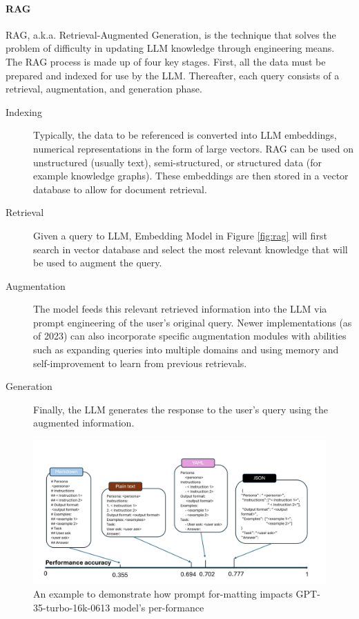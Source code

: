 \documentclass[fleqn,10pt]{SelfArx} %
\begin{document}
\paragraph{RAG} RAG, a.k.a. Retrieval-Augmented Generation, is the technique that solves the problem of difficulty in updating LLM knowledge through engineering means. The RAG process is made up of four key stages. First, all the data must be prepared and indexed for use by the LLM. Thereafter, each query consists of a retrieval, augmentation, and generation phase.\cite{gao2024retrievalaugmentedgenerationlargelanguage}
\begin{description}
	\item[Indexing] Typically, the data to be referenced is converted into LLM embeddings, numerical representations in the form of large vectors. RAG can be used on unstructured (usually text), semi-structured, or structured data (for example knowledge graphs).\cite{gao2024retrievalaugmentedgenerationlargelanguage} These embeddings are then stored in a vector database to allow for document retrieval.
	\item[Retrieval] Given a query to LLM, Embedding Model in Figure \ref{fig:rag} will first search in vector database and select the most relevant knowledge that will be used to augment the query.
	\item[Augmentation] The model feeds this relevant retrieved information into the LLM via prompt engineering of the user's original query.\cite{website} Newer implementations (as of 2023) can also incorporate specific augmentation modules with abilities such as expanding queries into multiple domains and using memory and self-improvement to learn from previous retrievals.\cite{gao2024retrievalaugmentedgenerationlargelanguage}
	\item[Generation] Finally, the LLM generates the response to the user's query using the augmented information.
\end{description}

\begin{figure}[ht]\centering
	\includegraphics[width=\linewidth]{Figures/prompt.png}
	\caption{An example to demonstrate how prompt for-matting impacts GPT-35-turbo-16k-0613 model's per-formance\cite{he2024doespromptformattingimpact}}
	\label{fig:prompt}
\end{figure}
\end{document}
